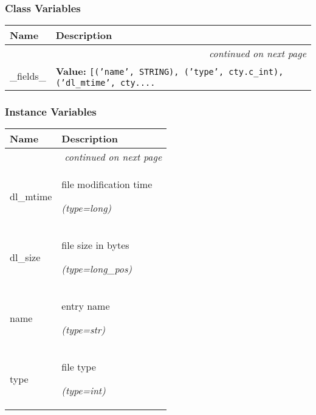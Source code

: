   \subsubsection{Class Variables}

    \vspace{-1cm}
\hspace{\varindent}\begin{longtable}{|p{\varnamewidth}|p{\vardescrwidth}|l}
\cline{1-2}
\cline{1-2} \centering \textbf{Name} & \centering \textbf{Description}& \\
\cline{1-2}
\endhead\cline{1-2}\multicolumn{3}{r}{\small\textit{continued on next page}}\\\endfoot\cline{1-2}
\endlastfoot\raggedright \_\-f\-i\-e\-l\-d\-s\-\_\- & \raggedright \textbf{Value:} 
{\tt [('name', STRING), ('type', cty.c\_int), ('dl\_mtime', cty.\texttt{...}}&\\
\cline{1-2}
\end{longtable}



  \subsubsection{Instance Variables}

    \vspace{-1cm}
\hspace{\varindent}\begin{longtable}{|p{\varnamewidth}|p{\vardescrwidth}|l}
\cline{1-2}
\cline{1-2} \centering \textbf{Name} & \centering \textbf{Description}& \\
\cline{1-2}
\endhead\cline{1-2}\multicolumn{3}{r}{\small\textit{continued on next page}}\\\endfoot\cline{1-2}
\endlastfoot\raggedright d\-l\-\_\-m\-t\-i\-m\-e\- & \raggedright file modification time

            {\it (type=long)}&\\
\cline{1-2}
\raggedright d\-l\-\_\-s\-i\-z\-e\- & \raggedright file size in bytes

            {\it (type=long\_pos)}&\\
\cline{1-2}
\raggedright n\-a\-m\-e\- & \raggedright entry name

            {\it (type=str)}&\\
\cline{1-2}
\raggedright t\-y\-p\-e\- & \raggedright file type

            {\it (type=int)}&\\
\cline{1-2}
\end{longtable}

